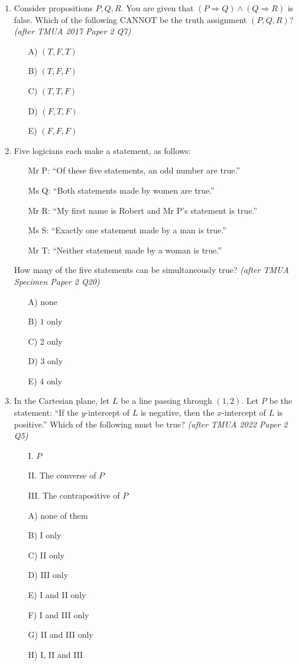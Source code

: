 \documentclass[11pt,a4paper]{article}
\begin{document}
\begin{enumerate}
\item Consider propositions $P, Q, R$. You are given that $(P \Rightarrow Q) \land (Q \Rightarrow R)$ is false. Which of the following CANNOT be the truth assignment $(P, Q, R)$? \textit{\small(after TMUA 2017 Paper 2 Q7)}
\begin{itemize}
\item[A)] $(T, F, T)$
\item[B)] $(T, F, F)$
\item[C)] $(T, T, F)$
\item[D)] $(F, T, F)$
\item[E)] $(F, F, F)$
\end{itemize}

\item Five logicians each make a statement, as follows:
\begin{itemize}
\item[Mr P:] ``Of these five statements, an odd number are true.''
\item[Ms Q:] ``Both statements made by women are true.''
\item[Mr R:] ``My first name is Robert and Mr P's statement is true.''
\item[Ms S:] ``Exactly one statement made by a man is true.''
\item[Mr T:] ``Neither statement made by a woman is true.''
\end{itemize}
How many of the five statements can be simultaneously true? \textit{\small(after TMUA Specimen Paper 2 Q20)}
\begin{itemize}
\item[A)] none
\item[B)] $1$ only
\item[C)] $2$ only
\item[D)] $3$ only
\item[E)] $4$ only
\end{itemize}

\item In the Cartesian plane, let $L$ be a line passing through $(1, 2)$. Let $P$ be the statement: ``If the $y$-intercept of $L$ is negative, then the $x$-intercept of $L$ is positive.'' Which of the following must be true? \textit{\small(after TMUA 2022 Paper 2 Q5)}
\begin{itemize}
\item[I.] $P$
\item[II.] The converse of $P$
\item[III.] The contrapositive of $P$
\end{itemize}
\begin{itemize}
\item[A)] none of them
\item[B)] I only
\item[C)] II only
\item[D)] III only
\item[E)] I and II only
\item[F)] I and III only
\item[G)] II and III only
\item[H)] I, II and III
\end{itemize}


\end{enumerate}
\end{document}
